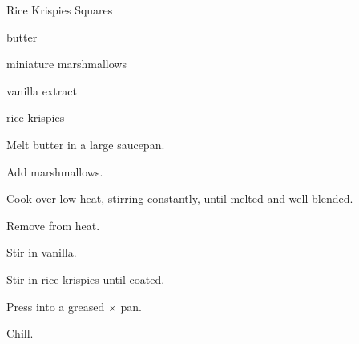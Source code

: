\begin{recipe}{Rice Krispies Squares}{}{}

\begin{ingredients}
\item \C{\quarter} butter
\item {} miniature marshmallows
\item {} vanilla extract
\item {} rice krispies
\end{ingredients}

\begin{directions}
\item Melt butter in a large saucepan.
\item Add marshmallows.
\item Cook over low heat, stirring constantly, until melted and well-blended.
\item Remove from heat.
\item Stir in vanilla.
\item Stir in rice krispies until coated.
\item Press into a greased $\times$ pan.
\item Chill.
\end{directions}

\end{recipe}
